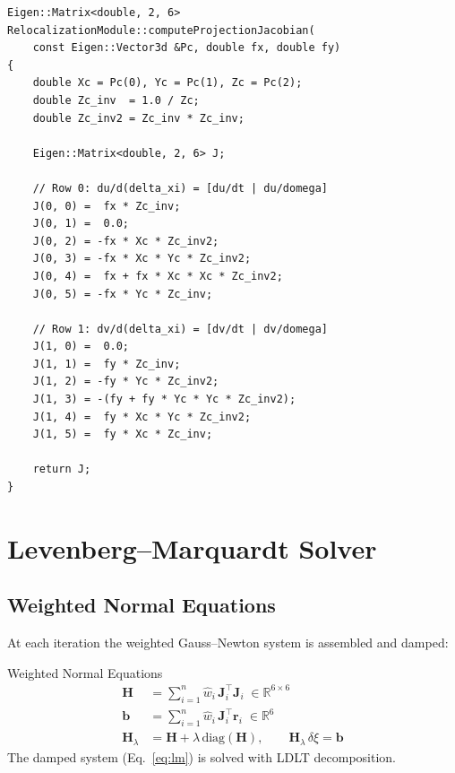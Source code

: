 \documentclass[12pt,a4paper]{article}
\begin{document}
\begin{lstlisting}[style=cpp,
  caption={\texttt{computeProjectionJacobian()} ---
           \texttt{relocalization.cpp}, lines\,1124--1147}]
Eigen::Matrix<double, 2, 6> RelocalizationModule::computeProjectionJacobian(
    const Eigen::Vector3d &Pc, double fx, double fy)
{
    double Xc = Pc(0), Yc = Pc(1), Zc = Pc(2);
    double Zc_inv  = 1.0 / Zc;
    double Zc_inv2 = Zc_inv * Zc_inv;

    Eigen::Matrix<double, 2, 6> J;

    // Row 0: du/d(delta_xi) = [du/dt | du/domega]
    J(0, 0) =  fx * Zc_inv;
    J(0, 1) =  0.0;
    J(0, 2) = -fx * Xc * Zc_inv2;
    J(0, 3) = -fx * Xc * Yc * Zc_inv2;
    J(0, 4) =  fx + fx * Xc * Xc * Zc_inv2;
    J(0, 5) = -fx * Yc * Zc_inv;

    // Row 1: dv/d(delta_xi) = [dv/dt | dv/domega]
    J(1, 0) =  0.0;
    J(1, 1) =  fy * Zc_inv;
    J(1, 2) = -fy * Yc * Zc_inv2;
    J(1, 3) = -(fy + fy * Yc * Yc * Zc_inv2);
    J(1, 4) =  fy * Xc * Yc * Zc_inv2;
    J(1, 5) =  fy * Xc * Zc_inv;

    return J;
}
\end{lstlisting}

\section{Levenberg--Marquardt Solver}

\subsection{Weighted Normal Equations}

At each iteration the weighted Gauss--Newton system is assembled and damped:

\begin{formulabox}{Weighted Normal Equations}
\begin{align}
  \mathbf{H}         &= \sum_{i=1}^{n} \hat{w}_i\,\mathbf{J}_i^\top\mathbf{J}_i
                        \;\in\mathbb{R}^{6\times6}
                        \label{eq:H} \\[4pt]
  \mathbf{b}         &= \sum_{i=1}^{n} \hat{w}_i\,\mathbf{J}_i^\top\mathbf{r}_i
                        \;\in\mathbb{R}^{6}
                        \label{eq:b} \\[4pt]
  \mathbf{H}_\lambda &= \mathbf{H} + \lambda\,\mathrm{diag}(\mathbf{H}),
  \qquad
  \mathbf{H}_\lambda\,\delta\xi = \mathbf{b}
  \label{eq:lm}
\end{align}
The damped system (Eq.~\ref{eq:lm}) is solved with LDLT decomposition.
\end{formulabox}
\end{document}
